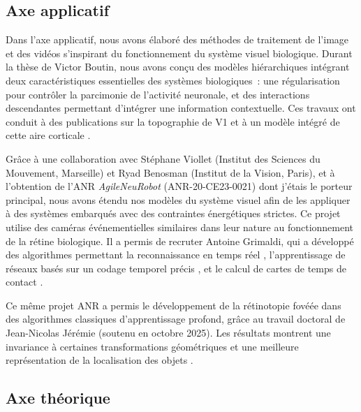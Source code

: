 \documentclass[11pt,french,a4paper,oneside]{article}
\begin{document}
\subsection{Axe applicatif}

Dans l'axe applicatif, nous avons élaboré des méthodes de traitement de l'image et des vidéos s'inspirant du fonctionnement du système visuel biologique. Durant la thèse de Victor Boutin, nous avons conçu des modèles hiérarchiques intégrant deux caractéristiques essentielles des systèmes biologiques~: une régularisation pour contrôler la parcimonie de l'activité neuronale, et des interactions descendantes permettant d'intégrer une information contextuelle. Ces travaux ont conduit à des publications sur la topographie de V1 \citep*{Chavane22} et à un modèle intégré de cette aire corticale \citep*{Franciosini22}.

Grâce à une collaboration avec Stéphane Viollet (Institut des Sciences du Mouvement, Marseille) et Ryad Benosman (Institut de la Vision, Paris), et à l'obtention de l'ANR \textit{AgileNeuRobot} (ANR-20-CE23-0021) dont j'étais le porteur principal, nous avons étendu nos modèles du système visuel afin de les appliquer à des systèmes embarqués avec des contraintes énergétiques strictes. Ce projet utilise des caméras événementielles similaires dans leur nature au fonctionnement de la rétine biologique. Il a permis de recruter Antoine Grimaldi, qui a développé des algorithmes permettant la reconnaissance en temps réel \citep*{Grimaldi24}, l'apprentissage de réseaux basés sur un codage temporel précis \citep*{Grimaldi23bc}, et le calcul de cartes de temps de contact \citep*{Nunes23iccv}.

Ce même projet ANR a permis le développement de la rétinotopie fovéée dans des algorithmes classiques d'apprentissage profond, grâce au travail doctoral de Jean-Nicolas Jérémie (soutenu en octobre 2025). Les résultats montrent une invariance à certaines transformations géométriques et une meilleure représentation de la localisation des objets \citep*{Jeremie25}.

\subsection{Axe théorique}
\end{document}
